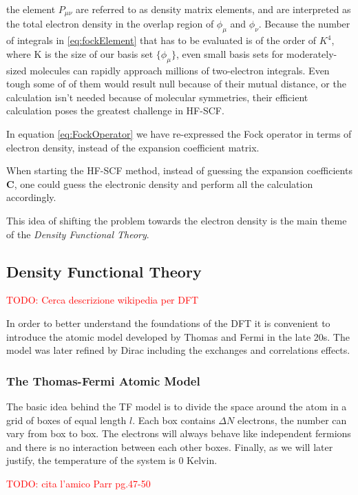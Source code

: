 \documentclass[a4paper,12pt]{article}
\newcommand\mynotes[1]{\begin{flushright}

\textcolor{red}{TODO: #1}\end{flushright}}
\begin{document}
the element $P_{\mu \nu}$ are referred to as density matrix elements, and are interpreted as the total electron density in the overlap region of $\phi_{\mu}$ and $\phi_{\nu}$.
Because the number of integrals in \eqref{eq:fockElement} that has to be evaluated is of the order of $K^4$, where K is the size of our basis set $\{\phi_{\mu}\}$, even small basis sets for moderately-sized molecules can rapidly approach millions of two-electron integrals. 
Even tough some of of them would result null because of their mutual distance, or the calculation isn't needed because of molecular symmetries, their efficient calculation poses the greatest challenge in HF-SCF.


In equation \eqref{eq:FockOperator} we have re-expressed the Fock operator in terms of electron density, instead of the expansion coefficient matrix. 

When starting the HF-SCF method, instead of guessing the expansion coefficients $\mathbf{C}$, one could guess the electronic density and perform all the calculation accordingly.


This idea of shifting the problem towards the electron density is the main theme of the \textit{Density Functional Theory}.



\subsection{Density Functional Theory}

\mynotes{Cerca descrizione wikipedia per DFT}

In order to better understand the foundations of the DFT it is convenient to introduce the atomic model developed by Thomas and Fermi in the late 20s. The model was later refined by Dirac including the exchanges and correlations effects.

\subsubsection{The Thomas-Fermi Atomic Model}

The basic idea behind the TF model is to divide the space around the atom in a grid of boxes of equal length $l$. 
Each box contains $\Delta N$ electrons, the number can vary from box to box. 
The electrons will always behave like independent fermions and there is no interaction between each other boxes.
Finally, as we will later justify, the temperature of the system is 0 Kelvin.
\mynotes{cita l'amico Parr pg.47-50}
\end{document}
